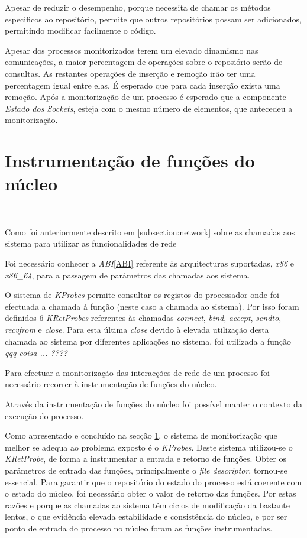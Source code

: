 Apesar de reduzir o desempenho, porque necessita de chamar os métodos especificos ao repositório, permite que outros repositórios possam ser adicionados, permitindo modificar facilmente o código.

Apesar dos processos monitorizados terem um elevado dinamismo nas comunicações, a maior percentagem de operações sobre o reposiório serão de consultas.
As restantes operações de inserção e remoção irão ter uma percentagem igual entre elas.
É esperado que para cada inserção exista uma remoção.
Após a monitorização de um processo é esperado que a componente \textit{Estado dos Sockets}, esteja com o mesmo número de elementos, que antecedeu a monitorização.

\section{Instrumentação de funções do núcleo}

----------------------------------------------------------------------------------------------------------

Como foi anteriormente descrito em \ref{subsection:network} sobre as chamadas aos sistema para utilizar as funcionalidades de rede

Foi necessário conhecer a \textit{ABI}\ref{ABI}\cite{ABI} referente às arquitecturas suportadas, \textit{x86} e \textit{x86\_64}, para a passagem de parâmetros das chamadas aos sistema.

O sistema de \textit{KProbes} permite consultar os registos do processador onde foi efectuada a chamada à função (neste caso a chamada ao sistema).
 Por isso foram definidos 6 \textit{KRetProbes} referentes às chamadas \textit{connect}, \textit{bind}, \textit{accept}, \textit{sendto}, \textit{recvfrom} e
\textit{close}.
 Para esta última \textit{close} devido à elevada utilização desta chamada ao sistema por diferentes aplicações no sistema, foi utilizada a função \textit{qqq coisa ...  ????}

Para efectuar a monitorização das interacções de rede de um processo foi necessário recorrer à instrumentação de funções do núcleo.

Através da instrumentação de funções do núcleo foi possível manter o contexto da execução do processo.

Como apresentado e concluído na secção \ref{}, o sistema de monitorização que melhor se adequa ao problema exposto é o \textit{KProbes}.
 Deste sistema utilizou-se o \textit{KRetProbe}, de forma a instrumentar a entrada e retorno de funções.
 Obter os parâmetros de entrada das funções, principalmente o \textit{file descriptor}, tornou-se essencial.
 Para garantir que o repositório do estado do processo está coerente com o estado do núcleo, foi necessário obter o valor de retorno das funções.
 Por estas razões e porque as chamadas ao sistema têm ciclos de modificação da bastante lentos, o que evidência elevada estabilidade e consistência do núcleo, e por ser ponto de entrada do processo no núcleo foram as funções instrumentadas.


